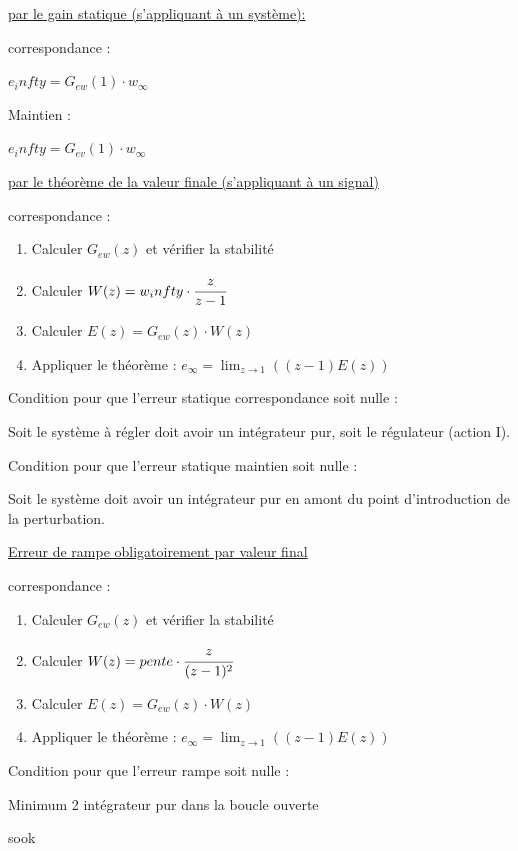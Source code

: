 \underline{par le gain statique (s'appliquant à un système):}

correspondance : 

$e_infty = G_{ew}(1) \cdot w_\infty$

Maintien :

$e_infty = G_{ev}(1) \cdot w_\infty$


\underline{par le théorème de la valeur finale (s'appliquant à un signal)}

correspondance : 
\begin{enumerate}
    \item Calculer $G_{ew}(z)$ et vérifier la stabilité
    \item Calculer $W(z) = w_infty \cdot \cfrac{z}{z-1}$
    \item Calculer $E(z) = G_{ew}(z) \cdot W(z)$
    \item Appliquer le théorème : $e_\infty = \lim_{z\rightarrow 1} ((z-1)E(z))$
\end{enumerate}

Condition pour que l'erreur statique correspondance soit nulle :

Soit le système à régler doit avoir un intégrateur pur, soit le régulateur (action I).


Condition pour que l'erreur statique maintien soit nulle :

Soit le système doit avoir un intégrateur pur en amont du point d'introduction de la perturbation.

\underline{Erreur de rampe obligatoirement par valeur final}

correspondance : 
\begin{enumerate}
    \item Calculer $G_{ew}(z)$ et vérifier la stabilité
    \item Calculer $W(z) = pente \cdot \cfrac{z}{(z-1)^2}$
    \item Calculer $E(z) = G_{ew}(z) \cdot W(z)$
    \item Appliquer le théorème : $e_\infty = \lim_{z\rightarrow 1} ((z-1)E(z))$
\end{enumerate}

Condition pour que l'erreur rampe soit nulle :

Minimum 2 intégrateur pur dans la boucle ouverte

\hformbar

\newpage
sook 
\newpage


